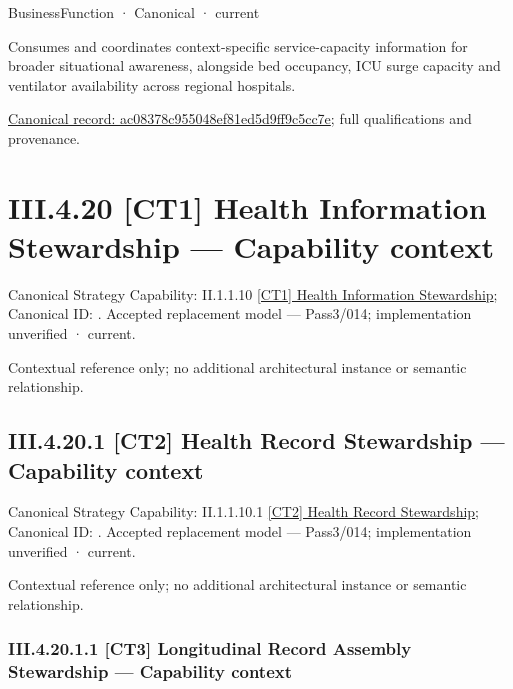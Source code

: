 \label{element:ac08378c955048ef81ed5d9ff9c5cc7e}
{\small BusinessFunction · Canonical · current}\par

Consumes and coordinates context-specific service-capacity information for broader situational awareness, alongside bed occupancy, ICU surge capacity and ventilator availability across regional hospitals.


{\footnotesize \href{../../../../continuum/business/business-function/ac08378c955048ef81ed5d9ff9c5cc7e.md}{Canonical record: ac08378c955048ef81ed5d9ff9c5cc7e}; full qualifications and provenance.}\par
\section*{III.4.20 [CT1] Health Information Stewardship — Capability context}
\label{navigation:III.4.20}

{\small Canonical Strategy Capability: II.1.1.10 \hyperref[element:3ed66006b3424bc086180c6738b1596d]{[CT1] Health Information Stewardship}; Canonical ID: \texttt{}. Accepted replacement model — Pass3/014; implementation unverified · current.}\par
Contextual reference only; no additional architectural instance or semantic relationship.\par
\subsection*{III.4.20.1 [CT2] Health Record Stewardship — Capability context}
\label{navigation:III.4.20.1}

{\small Canonical Strategy Capability: II.1.1.10.1 \hyperref[element:8532e6d5a687459b9defad56f837fa0a]{[CT2] Health Record Stewardship}; Canonical ID: \texttt{}. Accepted replacement model — Pass3/014; implementation unverified · current.}\par
Contextual reference only; no additional architectural instance or semantic relationship.\par
\subsubsection*{III.4.20.1.1 [CT3] Longitudinal Record Assembly Stewardship — Capability context}
\label{navigation:III.4.20.1.1}

